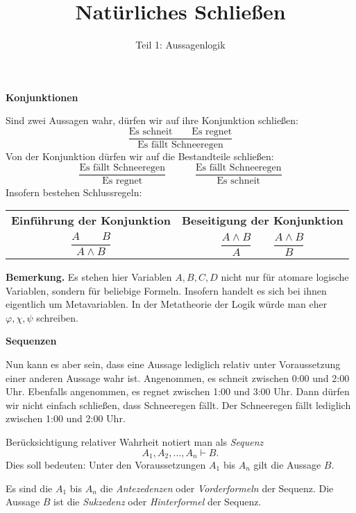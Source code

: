 \documentclass[8pt]{beamer}
\title{Natürliches Schließen}
\subtitle{Teil 1: Aussagenlogik}
\date{}
\newcommand{\strong}[1]{\textsf{\textbf{#1}}}
\newcommand{\centerheadline}[1]{%
  \begin{center}\strong{#1}\end{center}}
\newcommand{\parspace}{\vspace{0.8em}}
\begin{document}
\begin{frame}
\maketitle
\end{frame}

\begin{frame}
\centerheadline{Konjunktionen}
\end{frame}

\begin{frame}[t]
\vspace{2em}
Sind zwei Aussagen wahr, dürfen wir auf ihre Konjunktion schließen:
\[\dfrac{\text{Es schneit}\qquad\text{Es regnet}}{
  \text{Es fällt Schneeregen}}\]\pause
Von der Konjunktion dürfen wir auf die Bestandteile schließen:
\[\dfrac{\text{Es fällt Schneeregen}}{\text{Es regnet}}\qquad\quad
  \dfrac{\text{Es fällt Schneeregen}}{\text{Es schneit}}\]\pause
Insofern bestehen Schlussregeln:
\begin{center}
\begin{tabular}{c@{\qquad\quad}c}
\strong{\small Einführung der Konjunktion}
& \strong{\small Beseitigung der Konjunktion}\\[6pt]
$\dfrac{A\qquad B}{A\land B}$
& $\dfrac{A\land B}{A}\qquad\dfrac{A\land B}{B}$\\
\end{tabular}
\end{center}\pause

\parspace
\begin{footnotesize}
\strong{Bemerkung.} Es stehen hier Variablen $A,B,C,D$ nicht nur
für atomare logische Variablen, sondern für beliebige Formeln.
Insofern handelt es sich bei ihnen eigentlich um Metavariablen.
In der Metatheorie der Logik würde man eher $\varphi,\chi,\psi$
schreiben.
\end{footnotesize}
\end{frame}

\begin{frame}
\centerheadline{Sequenzen}
\end{frame}

\begin{frame}
Nun kann es aber sein, dass eine Aussage lediglich relativ unter
Voraussetzung einer anderen Aussage wahr ist. Angenommen, es schneit
zwischen 0:00 und 2:00 Uhr. Ebenfalls angenommen, es regnet zwischen
1:00 und 3:00 Uhr. Dann dürfen wir nicht einfach schließen, dass
Schneeregen fällt. Der Schneeregen fällt lediglich zwischen
1:00 und 2:00 Uhr.\pause

\parspace
Berücksichtigung relativer Wahrheit notiert man als \emph{Sequenz}
\[A_1,A_2,\ldots,A_n\vdash B.\]
Dies soll bedeuten: Unter den Voraussetzungen $A_1$ bis $A_n$
gilt die Aussage $B$.\pause

\parspace
Es sind die $A_1$ bis $A_n$ die \emph{Antezedenzen} oder
\emph{Vorderformeln} der Sequenz. Die Aussage $B$ ist die
\emph{Sukzedenz} oder \emph{Hinterformel} der Sequenz.
\end{frame}
\end{document}
